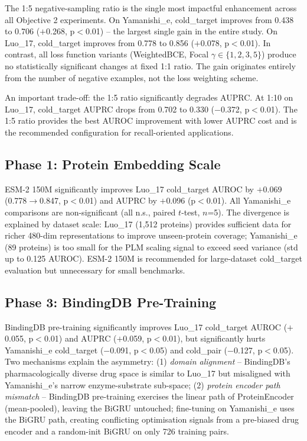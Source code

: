 \documentclass[12pt,a4paper,oneside]{report}
\begin{document}
The 1:5 negative-sampling ratio is the single most impactful enhancement across all Objective 2 experiments. On Yamanishi\_e, cold\_target improves from 0.438 to 0.706 ($+$0.268, p${<}$0.01) -- the largest single gain in the entire study. On Luo\_17, cold\_target improves from 0.778 to 0.856 ($+$0.078, p${<}$0.01). In contrast, all loss function variants (WeightedBCE, Focal $\gamma \in \{1,2,3,5\}$) produce no statistically significant changes at fixed 1:1 ratio. The gain originates entirely from the number of negative examples, not the loss weighting scheme.

An important trade-off: the 1:5 ratio significantly degrades AUPRC. At 1:10 on Luo\_17, cold\_target AUPRC drops from 0.702 to 0.330 ($-$0.372, p${<}$0.01). The 1:5 ratio provides the best AUROC improvement with lower AUPRC cost and is the recommended configuration for recall-oriented applications.

\subsection{Phase 1: Protein Embedding Scale}

ESM-2 150M significantly improves Luo\_17 cold\_target AUROC by $+$0.069 (0.778$\to$0.847, p${<}$0.01) and AUPRC by $+$0.096 (p${<}$0.01). All Yamanishi\_e comparisons are non-significant (all n.s., paired $t$-test, $n$=5). The divergence is explained by dataset scale: Luo\_17 (1,512 proteins) provides sufficient data for richer 480-dim representations to improve unseen-protein coverage; Yamanishi\_e (89 proteins) is too small for the PLM scaling signal to exceed seed variance (std up to 0.125 AUROC). ESM-2 150M is recommended for large-dataset cold\_target evaluation but unnecessary for small benchmarks.

\subsection{Phase 3: BindingDB Pre-Training}

BindingDB pre-training significantly improves Luo\_17 cold\_target AUROC ($+$0.055, p${<}$0.01) and AUPRC ($+$0.059, p${<}$0.01), but significantly hurts Yamanishi\_e cold\_target ($-$0.091, p${<}$0.05) and cold\_pair ($-$0.127, p${<}$0.05). Two mechanisms explain the asymmetry: (1) \emph{domain alignment} -- BindingDB's pharmacologically diverse drug space is similar to Luo\_17 but misaligned with Yamanishi\_e's narrow enzyme-substrate sub-space; (2) \emph{protein encoder path mismatch} -- BindingDB pre-training exercises the linear path of ProteinEncoder (mean-pooled), leaving the BiGRU untouched; fine-tuning on Yamanishi\_e uses the BiGRU path, creating conflicting optimisation signals from a pre-biased drug encoder and a random-init BiGRU on only 726 training pairs.
\end{document}
